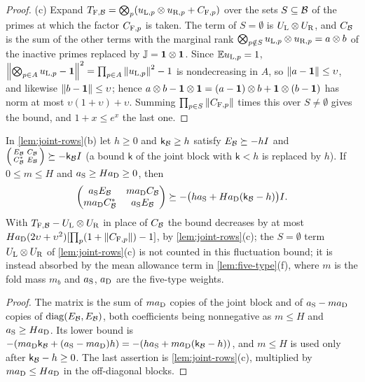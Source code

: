 \begin{proof}
(c) Expand $T_{{\rm F},\mathcal B}=\bigotimes_p(u_{{\rm L},p}\otimes u_{{\rm R},p}+C_{{\rm F},p})$
over the sets $S\subseteq\mathcal B$ of the primes at which the factor $C_{{\rm F},p}$ is taken.
The term of $S=\emptyset$ is $U_{\rm L}\otimes U_{\rm R}$, and $C_\mathcal B$ is the sum of the
other terms with the marginal rank
$\bigotimes_{p\notin S}u_{{\rm L},p}\otimes u_{{\rm R},p}=a\otimes b$ of the inactive
primes replaced by $\mathbb J=\mathbf 1\otimes\mathbf 1$. Since $\mathbb E u_{{\rm L},p}=1$,
$\left\|\bigotimes_{p\in A}u_{{\rm L},p}-\mathbf 1\right\|^2=\prod_{p\in A}\left\|u_{{\rm L},p}\right\|^2-1$ is
nondecreasing in $A$, so $\left\|a-\mathbf 1\right\|\le\upsilon$, and likewise $\left\|b-\mathbf 1\right\|\le\upsilon$;
hence $a\otimes b-\mathbf 1\otimes\mathbf 1=(a-\mathbf 1)\otimes b+\mathbf 1\otimes(b-\mathbf 1)$ has norm at most
$\upsilon(1+\upsilon)+\upsilon$. Summing $\prod_{p\in S}\left\|C_{{\rm F},p}\right\|$ times this over
$S\ne\emptyset$ gives the bound, and $1+x\le e^x$ the last one.
\end{proof}

\begin{corollary}\label{cor:joint-row-split}
In \cref{lem:joint-rows}(b) let $h\ge0$ and $\mathsf k_\mathcal B\ge h$ satisfy
$E_\mathcal B\succeq-hI$ and $\begin{psmallmatrix}E_\mathcal B&C_\mathcal B\\C_\mathcal B^*&E_\mathcal B\end{psmallmatrix}
\succeq-\mathsf k_\mathcal B I$ (a bound $\mathsf k$ of the joint block with $\mathsf k<h$ is
replaced by $h$). If $0\le m\le H$ and $a_{\rm S}\ge Ha_{\rm D}\ge0$, then
\[
 \begin{pmatrix}a_{\rm S}E_\mathcal B&ma_{\rm D}C_\mathcal B\\ma_{\rm D}C_\mathcal B^*&a_{\rm S}E_\mathcal B
 \end{pmatrix}\succeq-\bigl(ha_{\rm S}+Ha_{\rm D}(\mathsf k_\mathcal B-h)\bigr)I .
\]
With $T_{{\rm F},\mathcal B}-U_{\rm L}\otimes U_{\rm R}$ in place of $C_\mathcal B$ the bound decreases
by at most $Ha_{\rm D}(2\upsilon+\upsilon^2)[\prod_p(1+\left\|C_{{\rm F},p}\right\|)-1]$, by
\cref{lem:joint-rows}(c); the $S=\emptyset$ term
$U_{\rm L}\otimes U_{\rm R}$ of \cref{lem:joint-rows}(c) is not counted in
this fluctuation bound; it is instead absorbed by the mean allowance term
in \cref{lem:five-type}(f),
where $m$ is the fold mass $m_b$ and $a_{\rm S}$, $a_{\rm D}$ are the five-type weights.
\end{corollary}

\begin{proof}
The matrix is the sum of $ma_{\rm D}$ copies of the joint block and of
$a_{\rm S}-ma_{\rm D}$ copies of $\operatorname{diag}(E_\mathcal B,E_\mathcal B)$, both coefficients being
nonnegative as $m\le H$ and $a_{\rm S}\ge Ha_{\rm D}$. Its lower bound is
$-(ma_{\rm D}\mathsf k_\mathcal B+(a_{\rm S}-ma_{\rm D})h)=-(ha_{\rm S}+ma_{\rm D}(\mathsf
k_\mathcal B-h))$, and $m\le H$ is used only after $\mathsf k_\mathcal B-h\ge0$. The last assertion
is \cref{lem:joint-rows}(c), multiplied by $ma_{\rm D}\le Ha_{\rm D}$ in the off-diagonal
blocks.
\end{proof}


